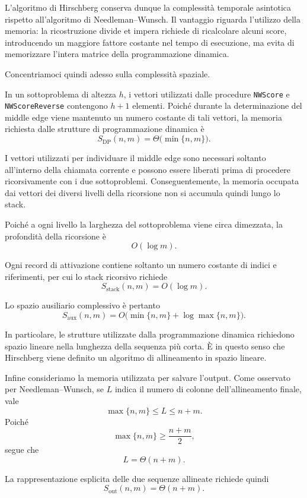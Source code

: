 L'algoritmo di Hirschberg conserva dunque la complessità temporale asintotica rispetto all'algoritmo di Needleman--Wunsch.
Il vantaggio riguarda l'utilizzo della memoria: la ricostruzione divide et impera richiede di ricalcolare alcuni score,
introducendo un maggiore fattore costante nel tempo di esecuzione, ma evita di memorizzare l'intera matrice della programmazione dinamica.

Concentriamoci quindi adesso sulla complessità spaziale.

In un sottoproblema di altezza $h$, i vettori utilizzati dalle procedure \texttt{NWScore} e \texttt{NWScoreReverse} contengono $h+1$ elementi.
Poiché durante la determinazione del middle edge viene mantenuto un numero costante di tali vettori, la memoria richiesta dalle strutture di programmazione dinamica è
\[
    S_{\mathrm{DP}}(n,m) = \Theta\bigl(\min \{ n,m \}\bigr).
\]

I vettori utilizzati per individuare il middle edge sono necessari soltanto all'interno della chiamata corrente
e possono essere liberati prima di procedere ricorsivamente con i due sottoproblemi.
Conseguentemente, la memoria occupata dai vettori dei diversi livelli della ricorsione non si accumula quindi lungo lo stack.

Poiché a ogni livello la larghezza del sottoproblema viene circa dimezzata,
la profondità della ricorsione è 
\[
    O( \log m).
\]

Ogni record di attivazione contiene soltanto un numero costante di indici e riferimenti, per cui lo stack
ricorsivo richiede
\[
    S_{\mathrm{stack}}(n,m) = O( \log m).
\]

Lo spazio ausiliario complessivo è pertanto
\[
    S_{\mathrm{aux}}(n,m) = O\bigl( \min \{ n,m \}+ \log  \max \{ n,m \}\bigr).
\]

In particolare, le strutture utilizzate dalla programmazione dinamica richiedono spazio lineare nella lunghezza della sequenza
più corta. È in questo senso che Hirschberg viene definito un algoritmo di allineamento in spazio lineare.

Infine consideriamo la memoria utilizzata per salvare l'output.
Come osservato per Needleman--Wunsch, se $L$ indica il numero di colonne dell'allineamento finale, vale
\[
    \max \{ n,m \} \leq L \leq n+m.
\]
Poiché
\[
    \max \{ n,m \} \geq \frac{n+m}{2},
\]
segue che
\[
    L = \Theta(n+m).
\]

La rappresentazione esplicita delle due sequenze allineate richiede quindi
\[
    S_{\mathrm{out}}(n,m) = \Theta(n+m).
\]

